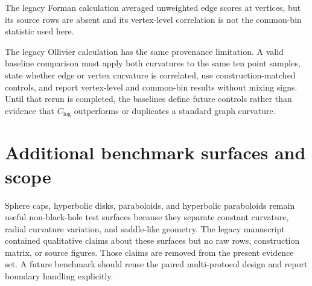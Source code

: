 \documentclass[11pt,a4paper]{article}
\begin{document}
The legacy Forman calculation averaged unweighted edge scores at vertices, but its source rows are absent and its vertex-level correlation is not the common-bin statistic used here.

The legacy Ollivier calculation has the same provenance limitation. A valid baseline comparison must apply both curvatures to the same ten point samples, state whether edge or vertex curvature is correlated, use construction-matched controls, and report vertex-level and common-bin results without mixing signs. Until that rerun is completed, the baselines define future controls rather than evidence that $C_{\log}$ outperforms or duplicates a standard graph curvature.

\section{Additional benchmark surfaces and scope}
\label{sec:limitations}

Sphere caps, hyperbolic disks, paraboloids, and hyperbolic paraboloids remain useful non-black-hole test surfaces because they separate constant curvature, radial curvature variation, and saddle-like geometry. The legacy manuscript contained qualitative claims about these surfaces but no raw rows, construction matrix, or source figures. Those claims are removed from the present evidence set. A future benchmark should reuse the paired multi-protocol design and report boundary handling explicitly.
\end{document}
